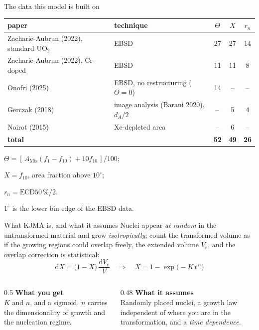\documentclass[10pt,aspectratio=169]{beamer}
\begin{document}
\begin{frame}{The data this model is built on}
  \small
  
  \begin{center}
  \footnotesize
  \begin{tabular}{llccc}
    \toprule
    paper & technique & $\Theta$ & $X$ & $r_n$ \\
    \midrule
    Zacharie-Aubrun (2022), standard UO$_2$ & EBSD                         & 27 & 27 & 14 \\
    Zacharie-Aubrun (2022), Cr-doped        & EBSD                         & 11 & 11 &  8 \\
    Onofri (2025)                           & EBSD, no restructuring ($\Theta = 0$) & 14 & -- & -- \\
    Gerczak (2018)                          & image analysis (Barani 2020), $d_A/2$ & -- &  5 &  4 \\
    Noirot (2015)                           & Xe-depleted area                &  -- &  6 & -- \\
    \midrule
    \textbf{total}                          &                              & \textbf{52} & \textbf{49} & \textbf{26} \\
    \bottomrule
  \end{tabular}
  \end{center}

  \footnotesize
  $\Theta = [\,A_{\text{Mis}}(f_1-f_{10}) + 10 f_{10}\,]/100$; \quad
  
  $X = f_{10}$, area fraction above $10^\circ$; \quad
  
  $r_n = \text{ECD50}\,\%/2$.

  $1^\circ$ is the lower bin edge of the EBSD data.
\end{frame}

\begin{frame}{What KJMA is, and what it assumes}
  Nuclei appear \emph{at random} in the untransformed material and grow \emph{isotropically};
  count the transformed volume as if the growing regions could overlap freely, the
  \alert{extended volume} $V_e$, and the overlap correction is statistical:
  \[ \mathrm{d}X = \Big(1 - X\Big)\,\frac{\mathrm{d}V_e}{V}
     \quad\Longrightarrow\quad
     X = 1 - \exp\!\big(-K\,t^{\,n}\big) \]

  \begin{columns}[T]
    \begin{column}{0.5\textwidth}
      \textbf{What you get}\\
      \small
      $K$ and $n$, and a sigmoid. $n$ carries the dimensionality of growth
      and the nucleation regime.
    \end{column}
    \begin{column}{0.48\textwidth}
      \textbf{What it assumes}\\
      \small
      Randomly placed nuclei, a growth law independent of where you are in the
      transformation, and a \emph{time dependence}.
    \end{column}
  \end{columns}

\end{frame}
\end{document}
